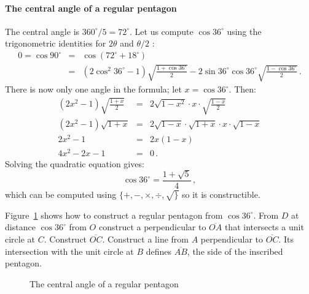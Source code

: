 \documentclass[11pt,a4paper]{article}
\newenvironment{form}[1]{%
\begin{displaymath}%
\renewcommand{\arraystretch}{#1}%
\begin{array}{lcl}}%
{\end{array}%
\end{displaymath}%
}
\newcommand*{\disfrac}[2]{\displaystyle\frac{#1}{#2}}
\newcommand*{\sm}[1]{$\scriptstyle #1$}
\begin{document}
\paragraph{The central angle of a regular pentagon}
The central angle is $360^\circ/5=72^\circ$. Let us compute $\cos 36^\circ$ using the  trigonometric identities for $2\theta$ and $\theta/2$ \cite{wiki:pentagon}:
\begin{form}{1.5}
0=\cos 90^\circ &=& \cos(72^\circ+18^\circ)\\
&=&(2\cos^2 36^\circ-1)\sqrt{\disfrac{1+\cos 36^\circ}{2}}-2\sin 36^\circ\cos 36^\circ\sqrt{\disfrac{1-\cos 36^\circ}{2}}\,.
\end{form}
There is now only one angle in the formula; let $x=\cos 36^\circ$. Then:
\begin{form}{1.5}
(2x^2-1)\sqrt{\disfrac{1+x}{2}}&=&2\sqrt{1-x^2}\cdot x \cdot \sqrt{\disfrac{1-x}{2}}\\
(2x^2-1)\sqrt{1+x}&=&2\sqrt{1-x}\cdot\sqrt{1+x}\cdot x \cdot \sqrt{1-x}\\
2x^2-1&=&2x(1-x)\\
4x^2-2x-1&=&0\,.
\end{form}
Solving the quadratic equation gives:
\[
\cos 36^\circ = \disfrac{1+\sqrt{5}}{4}\,,
\]
which can be computed using $\{+,-,\times,\div,\surd\}$ so it is constructible.

Figure~\ref{fig.pentagon} shows how to construct a regular pentagon from $\cos 36^\circ$. From $D$ at distance $\cos 36^\circ$ from $O$ construct a perpendicular to $\overline{OA}$ that intersects a unit circle at $C$. Construct $\overline{OC}$. Construct a line from $A$ perpendicular to $\overline{OC}$. Its intersection with the unit circle at $B$ defines $\overline{AB}$, the side of the inscribed pentagon. 

\begin{figure}[htb]
\begin{center}
\caption{The central angle of a regular pentagon}\label{fig.pentagon}
\end{center}
\end{figure}
\end{document}

